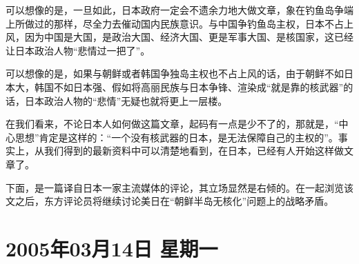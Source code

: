\documentclass[a4paper,11pt]{article}
\begin{document}
\begin{itemize}
\begin{itemize}
    可以想像的是，一旦如此，日本政府一定会不遗余力地大做文章，象在钓鱼岛争端上所做过的那样，尽全力去催动国内民族意识。与中国争钓鱼岛主权，日本不占上风，因为中国是大国，是政治大国、经济大国、更是军事大国、是核国家，这已经让日本政治人物“悲情过一把了”。

    可以想像的是，如果与朝鲜或者韩国争独岛主权也不占上风的话，由于朝鲜不如日本大，韩国不如日本强、假如将高丽民族与日本争锋、渲染成“就是靠的核武器”的话，日本政治人物的“悲情”无疑也就将更上一层楼。

    在我们看来，不论日本人如何做这篇文章，起码有一点是少不了的，那就是，“中心思想”肯定是这样的：“一个没有核武器的日本，是无法保障自己的主权的”。事实上，从我们得到的最新资料中可以清楚地看到，在日本，已经有人开始这样做文章了。

    下面，是一篇译自日本一家主流媒体的评论，其立场显然是右倾的。在一起浏览该文之后，东方评论员将继续讨论美日在“朝鲜半岛无核化”问题上的战略矛盾。




\end{itemize} %
\end{itemize} %
\section{2005年03月14日 星期一}
\label{sec-2}
\end{document}
